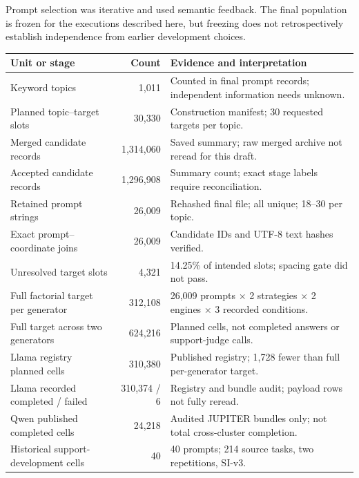 Prompt selection was iterative and used semantic feedback.  The final population is frozen for the executions described here, but freezing does not retrospectively establish independence from earlier development choices.

\begin{table}[t]
\small
\begin{tabularx}{\textwidth}{@{}p{}rY@{}}
\toprule
Unit or stage & Count & Evidence and interpretation\\
\midrule
Keyword topics & 1,011 & Counted in final prompt records; independent information needs unknown.\\
Planned topic--target slots & 30,330 & Construction manifest; 30 requested targets per topic.\\
Merged candidate records & 1,314,060 & Saved summary; raw merged archive not reread for this draft.\\
Accepted candidate records & 1,296,908 & Summary count; exact stage labels require reconciliation.\\
Retained prompt strings & 26,009 & Rehashed final file; all unique; 18--30 per topic.\\
Exact prompt--coordinate joins & 26,009 & Candidate IDs and UTF-8 text hashes verified.\\
Unresolved target slots & 4,321 & 14.25\% of intended slots; spacing gate did not pass.\\
\midrule
Full factorial target per generator & 312,108 & 26,009 prompts $\times$ 2 strategies $\times$ 2 engines $\times$ 3 recorded conditions.\\
Full target across two generators & 624,216 & Planned cells, not completed answers or support-judge calls.\\
Llama registry planned cells & 310,380 & Published registry; 1,728 fewer than full per-generator target.\\
Llama recorded completed / failed & 310,374 / 6 & Registry and bundle audit; payload rows not fully reread.\\
Qwen published completed cells & 24,218 & Audited JUPITER bundles only; not total cross-cluster completion.\\
Historical support-development cells & 40 & 40 prompts; 214 source tasks, two repetitions, SI-v3.\\

\end{tabularx}
\end{table}
